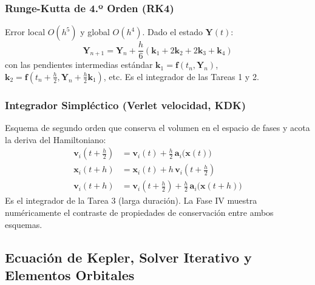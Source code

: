 \documentclass[11pt, a4paper]{article}
\begin{document}
\subsubsection{Runge-Kutta de 4.º Orden (RK4)}
Error local $O(h^5)$ y global $O(h^4)$. Dado el estado $\mathbf{Y}(t)$:
\begin{equation}
	\mathbf{Y}_{n+1} = \mathbf{Y}_n + \frac{h}{6} \left(\mathbf{k}_1 + 2\mathbf{k}_2 + 2\mathbf{k}_3 + \mathbf{k}_4\right)
\end{equation}
con las pendientes intermedias estándar $\mathbf{k}_1 = \mathbf{f}(t_n, \mathbf{Y}_n)$, $\mathbf{k}_2 = \mathbf{f}(t_n + \tfrac{h}{2}, \mathbf{Y}_n + \tfrac{h}{2}\mathbf{k}_1)$, etc. Es el integrador de las Tareas 1 y 2.

\subsubsection{Integrador Simpléctico (Verlet velocidad, KDK)}
Esquema de segundo orden que conserva el volumen en el espacio de fases y acota la deriva del Hamiltoniano:
\begin{align}
	\mathbf{v}_i\left(t + \tfrac{h}{2}\right) &= \mathbf{v}_i(t) + \tfrac{h}{2}\,\mathbf{a}_i\bigl(\mathbf{x}(t)\bigr) \\
	\mathbf{x}_i(t+h) &= \mathbf{x}_i(t) + h\,\mathbf{v}_i\left(t+\tfrac{h}{2}\right) \\
	\mathbf{v}_i(t+h) &= \mathbf{v}_i\left(t+\tfrac{h}{2}\right) + \tfrac{h}{2}\,\mathbf{a}_i\bigl(\mathbf{x}(t+h)\bigr)
\end{align}
Es el integrador de la Tarea 3 (larga duración). La Fase IV muestra numéricamente el contraste de propiedades de conservación entre ambos esquemas.

\subsection{Ecuación de Kepler, Solver Iterativo y Elementos Orbitales}
\label{sec:kepler_solver}
\end{document}
